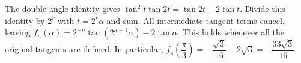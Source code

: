 The double-angle identity gives $\tan^2t\tan2t=\tan2t-2\tan t$. Divide this identity by $2^r$ with $t=2^r\alpha$ and sum. All intermediate tangent terms cancel, leaving $\boxed{f_n(\alpha)=2^{-n}\tan(2^{n+1}\alpha)-2\tan\alpha}$. This holds whenever all the original tangents are defined. In particular, $f_4 (\dfrac{\pi}{3}) = - \dfrac{\sqrt{3}}{16} - 2 \sqrt{3} = \boxed{- \dfrac{33 \sqrt{3}}{16}}$.
